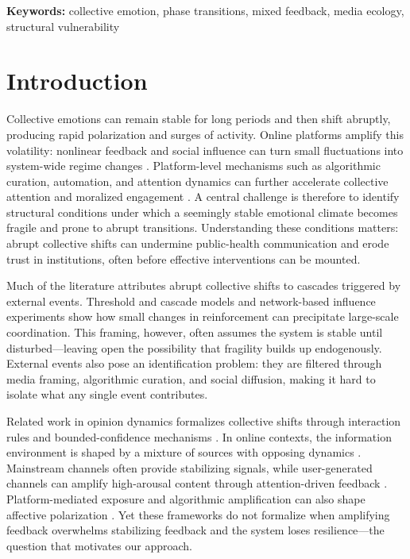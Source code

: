 \documentclass[11pt]{article}
\begin{document}
\noindent\textbf{Keywords:} collective emotion, phase transitions, mixed feedback, media ecology, structural vulnerability

\section{Introduction}
Collective emotions can remain stable for long periods and then shift abruptly, producing rapid polarization and surges of activity. Online platforms amplify this volatility: nonlinear feedback and social influence can turn small fluctuations into system-wide regime changes \citep{Centola2010,Watts2002,Becker2017}. Platform-level mechanisms such as algorithmic curation, automation, and attention dynamics can further accelerate collective attention and moralized engagement \citep{Lazer2018,LorenzSpreen2019,Crockett2017}. A central challenge is therefore to identify structural conditions under which a seemingly stable emotional climate becomes fragile and prone to abrupt transitions. Understanding these conditions matters: abrupt collective shifts can undermine public-health communication and erode trust in institutions, often before effective interventions can be mounted.

Much of the literature attributes abrupt collective shifts to cascades triggered by external events. Threshold and cascade models \citep{Granovetter1978,Watts2002,CentolaMacy2007,WattsDodds2007,Nyborg2016} and network-based influence experiments \citep{Centola2010,Becker2017} show how small changes in reinforcement can precipitate large-scale coordination. This framing, however, often assumes the system is stable until disturbed---leaving open the possibility that fragility builds up endogenously. External events also pose an identification problem: they are filtered through media framing, algorithmic curation, and social diffusion, making it hard to isolate what any single event contributes.

Related work in opinion dynamics formalizes collective shifts through interaction rules and bounded-confidence mechanisms \citep{Castellano2009,Deffuant2000,HegselmannKrause2002,HolleyLiggett1975,SoodRedner2005,Baronchelli2018,SchweitzerGarcia2010}. In online contexts, the information environment is shaped by a mixture of sources with opposing dynamics \citep{Chadwick2017}. Mainstream channels often provide stabilizing signals, while user-generated channels can amplify high-arousal content through attention-driven feedback \citep{Bakshy2015,DelVicario2016SciRep,Vosoughi2018,Piao2023}. Platform-mediated exposure and algorithmic amplification can also shape affective polarization \citep{Bail2018,Tornberg2022,Cinelli2021,Ribeiro2020,PennycookRand2021}. Yet these frameworks do not formalize when amplifying feedback overwhelms stabilizing feedback and the system loses resilience---the question that motivates our approach.
\end{document}
